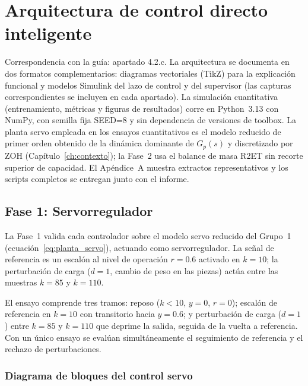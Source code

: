 \chapter{Arquitectura de control directo inteligente}
\label{ch:arquitectura}

Correspondencia con la guía: apartado 4.2.c. La arquitectura se documenta en dos formatos complementarios: diagramas vectoriales (TikZ) para la explicación funcional y modelos Simulink del lazo de control y del supervisor (las capturas correspondientes se incluyen en cada apartado). La simulación cuantitativa (entrenamiento, métricas y figuras de resultados) corre en Python~3.13 con NumPy, con semilla fija SEED=8 y sin dependencia de versiones de toolbox. La planta servo empleada en los ensayos cuantitativos es el modelo reducido de primer orden obtenido de la dinámica dominante de $G_p(s)$ y discretizado por ZOH (Capítulo~\ref{ch:contexto}); la Fase~2 usa el balance de masa R2ET sin recorte superior de capacidad. El Apéndice~A muestra extractos representativos y los scripts completos se entregan junto con el informe.

\section{Fase 1: Servorregulador}

La Fase~1 valida cada controlador sobre el modelo servo reducido del Grupo~1 (ecuación~\ref{eq:planta_servo}), actuando como servorregulador. La señal de referencia es un escalón al nivel de operación $r=0.6$ activado en $k=10$; la perturbación de carga ($d=1$, cambio de peso en las piezas) actúa entre las muestras $k=85$ y $k=110$.

El ensayo comprende tres tramos: reposo ($k<10$, $y=0$, $r=0$); escalón de referencia en $k=10$ con transitorio hacia $y=0.6$; y perturbación de carga ($d=1$) entre $k=85$ y $k=110$ que deprime la salida, seguida de la vuelta a referencia. Con un único ensayo se evalúan simultáneamente el seguimiento de referencia y el rechazo de perturbaciones.

\subsection*{Diagrama de bloques del control servo}

